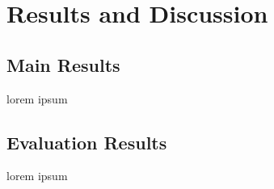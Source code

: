 \chapter{Results and Discussion}
\label{results_discussion}

\section{Main Results}
  lorem ipsum

\section{Evaluation Results}
  lorem ipsum
